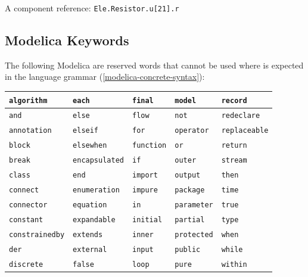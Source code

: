 \begin{example}
A component reference: \lstinline!Ele.Resistor.u[21].r!
\end{example}


\subsection{Modelica Keywords}\label{modelica-keywords}

The following Modelica  are reserved words that cannot be used where  is expected in the language grammar (\cref{modelica-concrete-syntax}):
\begin{center}
\begin{tabular}{l l l l l}
{\lstinline!algorithm!} & {\lstinline!each!} & {\lstinline!final!} & {\lstinline!model!} & {\lstinline!record!}\\ \hline
{\lstinline!and!} & {\lstinline!else!} & {\lstinline!flow!} & {\lstinline!not!} & {\lstinline!redeclare!}\\ \hline
{\lstinline!annotation!} & {\lstinline!elseif!} & {\lstinline!for!} & {\lstinline!operator!} & {\lstinline!replaceable!}\\ \hline
{\lstinline!block!} & {\lstinline!elsewhen!} & {\lstinline!function!} & {\lstinline!or!} & {\lstinline!return!}\\ \hline
{\lstinline!break!} & {\lstinline!encapsulated!} & {\lstinline!if!} & {\lstinline!outer!} & {\lstinline!stream!}\\ \hline
{\lstinline!class!} & {\lstinline!end!} & {\lstinline!import!} & {\lstinline!output!} & {\lstinline!then!}\\ \hline
{\lstinline!connect!} & {\lstinline!enumeration!} & {\lstinline!impure!} & {\lstinline!package!} & {\lstinline!time!}\\ \hline
{\lstinline!connector!} & {\lstinline!equation!} & {\lstinline!in!} & {\lstinline!parameter!} & {\lstinline!true!}\\ \hline
{\lstinline!constant!} & {\lstinline!expandable!} & {\lstinline!initial!} & {\lstinline!partial!} & {\lstinline!type!}\\ \hline
{\lstinline!constrainedby!} & {\lstinline!extends!} & {\lstinline!inner!} & {\lstinline!protected!} & {\lstinline!when!}\\ \hline
{\lstinline!der!} & {\lstinline!external!} & {\lstinline!input!} & {\lstinline!public!} & {\lstinline!while!}\\ \hline
{\lstinline!discrete!} & {\lstinline!false!} & {\lstinline!loop!} & {\lstinline!pure!} & {\lstinline!within!}\\
\end{tabular}
\end{center}

